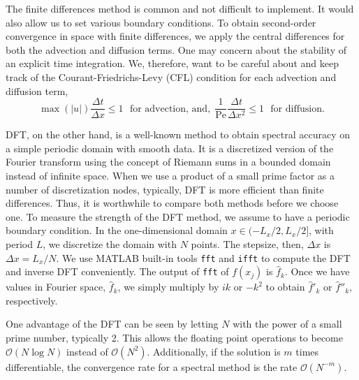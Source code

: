 The finite differences method is common and not difficult to implement. 
It would also allow us to set various boundary conditions. To obtain second-order convergence in space with finite differences, we apply the central differences for both the advection and diffusion terms. 
One may concern about the stability of an explicit time integration. We, therefore, want to be careful about and keep track of the Courant-Friedrichs-Levy (CFL) condition for each advection and diffusion term,
\begin{equation}
	\max(|u|) \frac{\Delta t}{\Delta x}  \leq 1 \ \ \ \text{for advection, and,}
	\ \  \frac{1}{\text{Pe}}\frac{\Delta t}{\Delta x^2}  \leq 1 \ \ \ \text{for diffusion}.
	\end{equation}

DFT, on the other hand, is a well-known method to obtain spectral accuracy on a simple periodic domain with smooth data. It is a discretized version of the Fourier transform using the concept of Riemann sums in a bounded domain instead of infinite space. 
When we use a product of a small prime factor as a number of discretization nodes, typically, DFT is more efficient than finite differences. Thus, it is worthwhile to compare both methods before we choose one. 
To measure the strength of the DFT method, we assume to have a periodic boundary condition. In the one-dimensional domain $x \in (-L_x/2, L_x/2]$, with period $L$, we discretize the domain with $N$ points. The stepsize, then, $\Delta x$ is$ \Delta x = L_x/N$.
We use MATLAB built-in tools \verb+fft+ and \verb+ifft+ to compute the DFT and inverse DFT conveniently.
The output of \verb+fft+ of $f(x_j)$ is $\hat{f}_k$. Once we have values in Fourier space, $\hat{f}_k$, we simply multiply by $ik$ or $-k^2$ to obtain $\hat{f}'_k$ or $\hat{f}''_k$, respectively. 
\par
One advantage of the DFT can be seen by letting $N$ with the power of a small prime number, typically 2. This allows the floating point operations to become $\mathcal{O}(N \log N)$ instead of $\mathcal{O}(N^2)$. Additionally, if the solution is $m$ times differentiable, the convergence rate for a spectral method is the rate $\mathcal{O}(N^{-m})$. 
